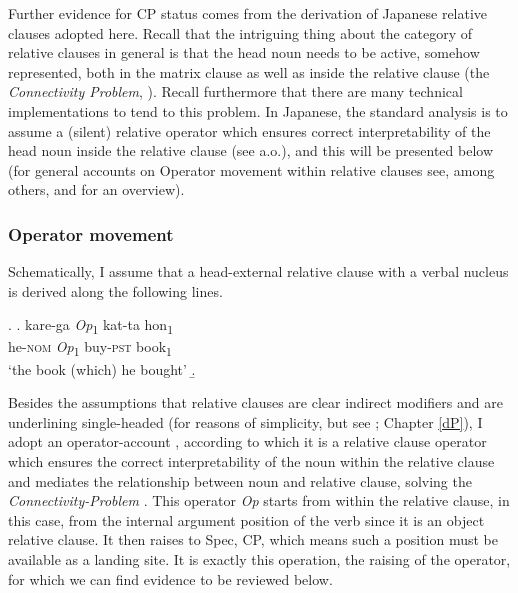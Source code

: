 \documentclass [output=book,colorlinks,citecolor=brown]{langscibook}
\begin{document}
Further evidence for CP status comes from the derivation of Japanese relative clauses adopted here. Recall that the intriguing thing about the category of relative clauses in general is that the head noun needs to be active, somehow represented, both in the matrix clause as well as inside the relative clause (the \textit{Connectivity Problem}, \citealt{salzmann:2017:reconstruction}). Recall furthermore that there are many technical implementations to tend to this problem. In Japanese, the standard analysis is to assume a (silent) relative operator which ensures correct interpretability of the head noun inside the relative clause (see \citealt{miyamoto:2017:RC} a.o.), and this will be presented below (for general accounts on Operator movement within relative clauses see, among others, \citealt{chomsky:1977:on, jackendoff:1977:x} and \citealt[ch. 2]{salzmann:2017:reconstruction} for an overview). %

\subsubsection{Operator movement}

 Schematically, I assume that a head-external relative clause with a verbal nucleus is derived along the following lines.

 \newpage

 \ex. \label{kareop} \ag. kare-ga \textit{Op}\textsubscript{1} kat-ta hon\textsubscript{1}\\
he-\textsc{nom} \textit{Op}\textsubscript{1} buy-\textsc{pst} book\textsubscript{1}\\
`the book (which) he bought'
 \b. 

Besides the assumptions that relative clauses are clear indirect modifiers and are underlining single-headed (for reasons of simplicity, but see \citealt{cinque:2020:relcl}; Chapter \ref{dP}), I adopt an operator-account \citep{ishii:1991:operators, miyamoto:2017:RC}, according to which it is a relative clause operator which ensures the correct interpretability of the noun within the relative clause and mediates the relationship between noun and relative clause, solving the \textit{Connectivity-Problem} \citep{salzmann:2017:reconstruction}. This operator \textit{Op} starts from within the relative clause, in this case, from the internal argument position of the verb since it is an object relative clause. It then raises to Spec, CP, which means such a position must be available as a landing site. It is exactly this operation, the raising of the operator, for which we can find evidence to be reviewed below. %
\end{document}
